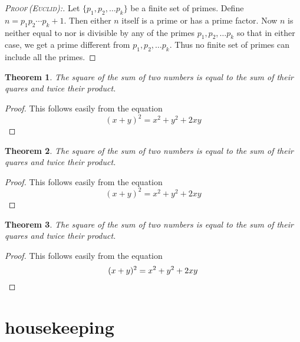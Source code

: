 \documentclass[a4paper, UTF8]{article}
\theoremstyle{definition}
\theoremstyle{remark}
\theoremstyle{plain}
\begin{document}
\begin{proof}[\textsc{Proof\,(Euclid)}:]
    Let $\{p_1,p_2,\dotsc p_k\}$ be a finite set of primes. Define $n=p_1p_2\dotsm p_k+1$. Then either $n$ itself is a prime or has a prime factor. Now $n$ is neither equal to nor is divisible by any of the primes $p_1,p_2,\dotsc p_k$ so that in either case, we get a prime different from $p_1,p_2,\dotsc p_k$. Thus no finite set of primes can include all the primes.
\end{proof}

\theoremstyle{plain}
\newtheorem{testrjp}{Theorem}[section]
\begin{testrjp}
    The square of the sum of two numbers is equal to the sum of their quares and twice their product.
\end{testrjp}

\begin{proof}
    This follows easily from the equation
    \begin{equation*}
        (x+y)^2=x^2+y^2+2xy
    \end{equation*}
\end{proof}

\begin{testrjp}
    The square of the sum of two numbers is equal to the sum of their quares and twice their product.
\end{testrjp}
\begin{proof}
    This follows easily from the equation
    \begin{equation*}
        (x+y)^2=x^2+y^2+2xy\tag*{\qed}
    \end{equation*}
    \renewcommand{\qed}{}
\end{proof}

\begin{testrjp}
    The square of the sum of two numbers is equal to the sum of their quares and twice their product.
\end{testrjp}
\begin{proof}
    This follows easily from the equation
    \begin{equation*}
        (x+y)^2=x^2+y^2+2xy\qed
    \end{equation*}
    \renewcommand{\qed}{}
\end{proof}
\newpage

\section{\Large housekeeping}
\end{document}
